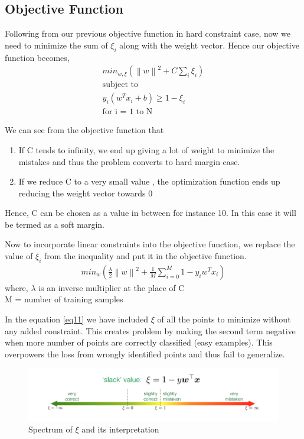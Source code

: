 \documentclass[11pt]{article}
\newcommand{\norm}[1]{\left\lVert#1\right\rVert}
\begin{document}
\subsection*{{\textbf{Objective Function}}}

Following from our previous objective function in hard constraint case, now we need to minimize the sum of \(\xi_{i}\) along with the weight vector. Hence our objective function becomes, 
\begin{gather*}
    min_{w, \xi}(\norm{w}^2 + C\sum_{i} \xi_{i}) \\
    \text{subject to} \\
    y_{i}(w^Tx_{i}+b) \geq 1 - \xi_{i} \\
    \text{for i = 1 to N}  
\end{gather*}

We can see from the objective function that 
\begin{enumerate}
    \item If C tends to infinity, we end up giving a lot of weight to minimize the mistakes and thus the problem converts to hard margin case.
    \item If we reduce C to a very small value , the optimization function ends up reducing the weight vector towards 0
\end{enumerate}
Hence, C can be chosen as a value in between for instance 10. In this case it will be termed as a soft margin.

Now to incorporate linear constraints into the objective function, we replace the value of \(\xi_{i}\) from the inequality and put it in the objective function.
\begin{align}
    min_{w}(\frac{\lambda}{2}\norm{w}^2 + \frac{1}{M}\sum_{i=0}^{M} 1- y_{i}w^Tx_{i}) \label{eq11}
\end{align}
where, \(\lambda\) is an inverse multiplier at the place of C \\
M = number of training samples

In the equation \ref{eq11} we have included \(\xi\) of all the points to minimize without any added constraint. This creates problem by making the second term negative when more number of points are correctly classified (easy examples). This overpowers the loss from wrongly identified points and thus fail to generalize. 

\begin{figure}[!htp]
        \centering
        \includegraphics[width=\textwidth]{images/xiRange.png}
        \caption{Spectrum of \(\xi\) and its interpretation}
\end{figure}
\end{document}
